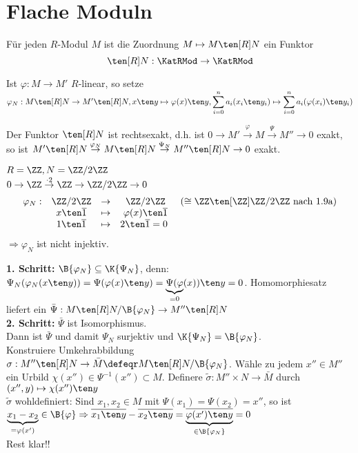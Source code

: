 \section{Flache Moduln}

\begin{Bem}
  Für jeden $R$-Modul $M$ ist die Zuordnung $M \mapsto M \ten[R] N$ ein Funktor
  \[
  \ten[R] N: \KatRMod \to \KatRMod
  \]
\end{Bem}

\begin{Bew} 
  Ist $\varphi: M \to M'$ $R$-linear, so setze $\varphi_N: M \ten[R] N \to M'
  \ten[R] N, x \ten y \mapsto \varphi(x) \ten y, \displaystyle
  \sum_{i=0}^na_i(x_i \ten y_i) \mapsto \sum_{i=0}^n a_i(\varphi(x_i) \ten y_i)$
\end{Bew}

\begin{Prop}
\label{1.12}
  Der Funktor $\ten[R] N$ ist rechtsexakt, d.h. ist $0 \to M'
  \overset{\varphi}{\to} M \overset{\Psi}{\to} M'' \to 0$ exakt, so ist $ M'
  \ten[R] N \overset{\varphi_N}{\to} M \ten[R] N \overset{\Psi_N}{\to} M'' \ten[R] N
  \to 0$ exakt.
\end{Prop}

\begin{nnBsp} 
  $R = \ZZ, N = \ZZ/2 \ZZ$\\
  $0 \to \ZZ \overset{ \cdot 2}{\to} \ZZ \to \ZZ/2
  \ZZ \to 0$
  \[
  \begin{matrix}
  \varphi_N:& \ZZ/2 \ZZ &\to& \ZZ / 2 \ZZ &(\cong \ZZ \ten[\ZZ] \ZZ / 2 \ZZ
  \text{ nach 1.9a})\\
  &x\ten\overline 1 & \mapsto & \varphi(x)\ten\overline 1&\\
  &1\ten\overline 1&\mapsto&2\ten\overline 1=0\
  \end{matrix}
  \]
  $\Rightarrow \varphi_N$ ist nicht injektiv.
\end{nnBsp}

\begin{Bew} 
  \textbf{1. Schritt:} $\B{\varphi_N} \subseteq \K{\Psi_N}$,
  denn: $\Psi_N(\varphi_N(x \ten y)) = \Psi(\varphi(x) \ten y) =
  \underset{=0}{\underbrace{\Psi(\varphi}}(x)) \ten y = 0$. Homomorphiesatz
  liefert ein $\bar{\Psi}: M \ten[R] N/\B{\varphi_N} \to M'' \ten[R]
  N$\\
  \textbf{2. Schritt:} $\bar{\Psi}$ ist Isomorphismus.\\
  Dann ist $\bar{\Psi}$ und damit $\Psi_N$ surjektiv und $\K{\Psi_N} =
  \B{\varphi_N}$.\\
  Konstruiere Umkehrabbildung $\sigma: M'' \ten[R] N \to \bar{M} \defeqr M
  \ten[R] N/\B{\varphi_N}$. Wähle zu jedem $x'' \in M''$ ein Urbild
  $\chi(x'') \in \Psi^{-1}(x'') \subset M$.
  Definere $\tilde{\sigma}: M'' \times N \to \bar{M}$ durch $(x'', y) \mapsto
  \chi(x'') \ten y$\\
  $\tilde{\sigma}$ wohldefiniert:
  Sind $x_1,x_2 \in M$ mit $\Psi(x_1) = \Psi(x_2) = x''$, so ist $\underset{= \varphi(x')
  }{\underbrace{x_1 - x_2}} \in \B{\varphi} \Rightarrow \overline{x_1
  \ten y} - \overline{x_2 \ten y} = \underset{\in \B{\varphi_N}
  }{\underbrace{\overline{\varphi(x') \ten y}}} = 0$\\
  Rest klar!!
\end{Bew}


